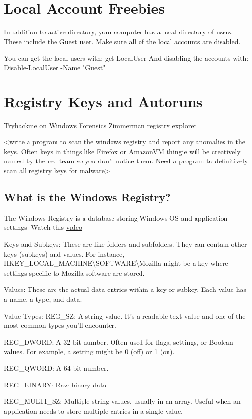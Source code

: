 \documentclass{article}
\begin{document}
\section{Local Account Freebies}
In addition to active directory, your computer has a local directory of users. These include the Guest user.
Make sure all of the local accounts are disabled.

You can get the local users with: get-LocalUser
And disabling the accounts with: Disable-LocalUser -Name "Guest"

\section{Registry Keys and Autoruns}
\href{https://tryhackme.com/room/windowsforensics1}{Tryhackme on Windows Forensics}
Zimmerman registry explorer

<write a program to scan the windows registry and report any anomalies in the keys.
Often keys in things like Firefox or AmazonVM thingie will be creatively named by the red team
so you don't notice them. Need a program to definitively scan all registry keys for malware>

\subsection{What is the Windows Registry?}
The Windows Registry is a database storing Windows OS and application settings. 
Watch this \href{https://youtu.be/_U78iAem3uo}{video}

Keys and Subkeys:
These are like folders and subfolders. They can contain other keys (subkeys) and values.
For instance, HKEY\_LOCAL\_MACHINE\textbackslash SOFTWARE\textbackslash Mozilla might be a key where settings specific to Mozilla software are stored.

Values:
These are the actual data entries within a key or subkey.
Each value has a name, a type, and data.

Value Types:
REG\_SZ: A string value. It's a readable text value and one of the most common types you'll encounter.

REG\_DWORD: A 32-bit number. Often used for flags, settings, or Boolean values. For example, a setting might be 0 (off) or 1 (on).

REG\_QWORD: A 64-bit number.

REG\_BINARY: Raw binary data.

REG\_MULTI\_SZ: Multiple string values, usually in an array. Useful when an application needs to store multiple entries in a single value.
\end{document}
